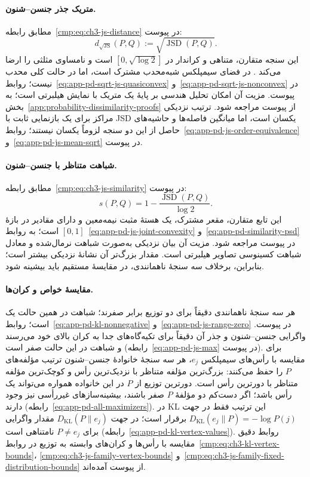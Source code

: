 \paragraph{متریک جذر جنسن--شنون.}
مطابق رابطه~\eqref{cmp:eq:ch3-js-distance} در پیوست:
\begin{equation}\label{cmp:eq:ch3-decision-js-metric}
d_{\sqrt{\mathrm{JS}}}(P,Q):=\sqrt{\operatorname{JSD}(P,Q)}.
\end{equation}
این سنجه متقارن، متناهی و کراندار در
$[0,\sqrt{\log2}]$ است و نامساوی مثلثی را ارضا می‌کند \cite{EndresSchindelin2003}.
در فضای سیمپلکس شبه‌محدب مشترک است، اما در حالت کلی
محدب نیست؛ روابط~\eqref{eq:app-pd-sqrt-js-quasiconvex}
و~\eqref{eq:app-pd-sqrt-js-nonconvex} در پیوست.
مزیت آن امکان تحلیل هندسی بر پایهٔ
یک متریک با نمایش هیلبرتی \cite{FugledeTopsoe2004} است؛
به بخش~\ref{app:probability-dissimilarity-proofs} از پیوست
مراجعه شود. ترتیب نزدیکی مراکز برای یک بازنمایی ثابت
با JSD یکسان است، اما میانگین فاصله‌ها و حاشیه‌های
حاصل از این دو سنجه لزوماً یکسان نیستند؛
روابط~\eqref{eq:app-pd-js-order-equivalence}
و~\eqref{eq:app-pd-js-mean-sqrt} در پیوست.

\paragraph{شباهت متناظر با جنسن--شنون.}
مطابق رابطه~\eqref{cmp:eq:ch3-js-similarity} در پیوست:
\begin{equation}\label{cmp:eq:ch3-decision-js-similarity}
s(P,Q)=1-\frac{\operatorname{JSD}(P,Q)}{\log2}.
\end{equation}
این تابع متقارن، مقعر مشترک، یک هستهٔ مثبت نیمه‌معین
و دارای مقادیر در بازهٔ $[0,1]$ است؛
به روابط~\eqref{eq:app-pd-js-joint-convexity}
و~\eqref{eq:app-pd-similarity-psd} در پیوست مراجعه شود.
مزیت آن بیان نزدیکی به‌صورت شباهت نرمال‌شده و
معادل شباهت کسینوسی تصاویر هیلبرتی است.
مقدار بزرگ‌تر آن نشانهٔ نزدیکی بیشتر است؛
بنابراین، برخلاف سه سنجهٔ ناهمانندی، در مقایسهٔ
مستقیم باید بیشینه شود.

\paragraph{مقایسهٔ خواص و کران‌ها.}
هر سه سنجهٔ ناهمانندی دقیقاً برای دو توزیع برابر صفرند؛
شباهت در همین حالت یک است؛ روابط~\eqref{eq:app-pd-kl-nonnegative}
و~\eqref{eq:app-pd-js-range-zero} در پیوست.
واگرایی جنسن--شنون و
جذر آن دقیقاً برای تکیه‌گاه‌های جدا به کران بالای خود
می‌رسند و شباهت در این حالت صفر است
(رابطه~\eqref{eq:app-pd-js-max} در پیوست).
برای مقایسه با رأس‌های سیمپلکس $e_j$، هر سه سنجهٔ
خانوادهٔ جنسن--شنون ترتیب مؤلفه‌های $P$ را حفظ می‌کنند:
بزرگ‌ترین مؤلفه متناظر با نزدیک‌ترین رأس و کوچک‌ترین
مؤلفه متناظر با دورترین رأس است. دورترین توزیع از
$P$ در این خانواده همواره می‌تواند یک رأس باشد؛
اگر دست‌کم دو مؤلفهٔ $P$ صفر باشند، بیشینه‌سازهای
غیررأسی نیز وجود دارند (رابطه~\eqref{eq:app-pd-all-maximizers}). در KL این ترتیب فقط در
جهت $D_{\mathrm{KL}}(e_j\|P)=-\log P(j)$ برقرار است؛
در جهت $D_{\mathrm{KL}}(P\|e_j)$ مقدار واگرایی برای
$P\ne e_j$ نامتناهی است
(رابطه~\eqref{eq:app-pd-kl-vertex-values}).
روابط دقیق مقایسه با رأس‌ها و کران‌های وابسته به
توزیع در روابط~\eqref{cmp:eq:ch3-kl-vertex-bounds}،
\eqref{cmp:eq:ch3-js-family-vertex-bounds}
و~\eqref{cmp:eq:ch3-js-family-fixed-distribution-bounds}
از پیوست آمده‌اند.

